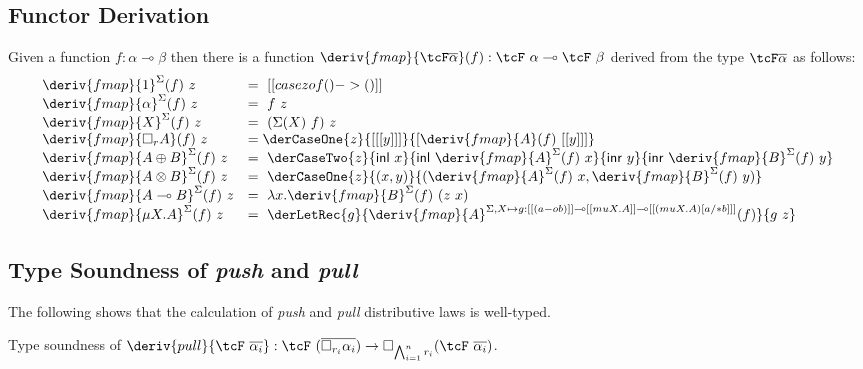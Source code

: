 \subsection{Functor Derivation}
\label{app:functor-derivation}

\begin{definition}
Given a function $f : \alpha \multimap \beta$ then
there is a function $\deriv{fmap}{\tcF \overline{\alpha}}(f)
: \tcF\ \alpha \multimap \tcF\ \beta$ derived from the type
$\tcF \overline{\alpha}$ as follows:
%
\begin{align*}
  \begin{array}{ll}
  \deriv{fmap}{1}^\Sigma(f)\ z &= \ [[ case z of () -> () ]]\\
  \deriv{fmap}{\alpha}^\Sigma(f)\ z &= \ f\ z\\
  \deriv{fmap}{X}^\Sigma(f)\ z &= \ (\Sigma(X)\ f)\ z \\
  \deriv{fmap}{\Box_{r}A}(f)\ z &= \derCaseOne{z}{ [[ [y] ]] }{ [ \deriv{fmap}{A}(f)\  [[ y ]] ] } \\
  \deriv{fmap}{A \oplus B}^\Sigma(f)\ z &= \ \derCaseTwo{z}{\mathsf{inl}\
                                       x}{\mathsf{inl}\ \deriv{fmap}{A}^\Sigma(f)\ x}{\mathsf{inr}\ y}
                            {\mathsf{inr}\ \deriv{fmap}{B}^\Sigma(f)\ y}
\\
  \deriv{fmap}{A \otimes B}^\Sigma(f)\ z &= \ \derCaseOne{z}{(x, y)}
   {( \deriv{fmap}{A}^\Sigma(f)\ x, \deriv{fmap}{B}^\Sigma(f)\ y )} \\
  \deriv{fmap}{A \multimap B}^\Sigma(f)\ z &= \  \lambda x . \deriv{fmap}{B}^\Sigma(f)\ (z\ x) \\
  \deriv{fmap}{\mu X . A}^\Sigma(f)\ z &= \ \derLetRec{g}{\deriv{fmap}{A}^{\Sigma, X \mapsto
g : [[ (a -o b) ]] \multimap [[ {mu X . A} ]] \multimap [[ {{(mu X . A)} [ a /* b ]} ]] }(f)}{g\ z}
    \end{array}
\end{align*}
\end{definition}

\subsection{Type Soundness of \emph{push} and \emph{pull}}
\label{proof:deriving-type-soundness}
%
The following shows that the calculation of \emph{push}
and \emph{pull} distributive laws is well-typed.

\begin{proposition}
\label{prop:soundness-pull}
Type soundness of $\deriv{pull}{\tcF\ \overline{\alpha_i}} : \tcF\ (\overline{\Box_{r_i} \alpha_i})
\rightarrow \Box_{\bigwedge^n_{i = 1} r_i} (\tcF\  \overline{\alpha_i})$.
\end{proposition}

